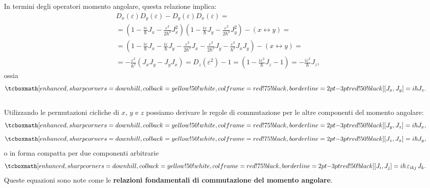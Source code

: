 \documentclass[a4paper,12pt,oneside]{book}
\begin{document}
In termini degli operatori momento angolare, questa relazione implica:
	\begin{align}
		& D_x (\varepsilon)D_y (\varepsilon)-D_y (\varepsilon)D_x (\varepsilon)= \nonumber\\
		&  = \left(1-\frac{i\varepsilon}{\hbar} J_x -\frac{\varepsilon ^2}{2\hbar ^2}J_x ^2\right)\left(1-\frac{i\varepsilon}{\hbar} J_y -\frac{\varepsilon ^2}{2\hbar ^2}J_y ^2\right)- \left( x \leftrightarrow y\right) =\nonumber \\
		& = \left(1-\frac{i\varepsilon}{\hbar} J_x-\frac{i\varepsilon}{\hbar} J_y-\frac{\varepsilon ^2}{2\hbar ^2}J_x-\frac{\varepsilon ^2}{2\hbar ^2}J_y-\frac{\varepsilon ^2}{\hbar ^2}J_xJ_y \right) - \left( x \leftrightarrow y\right) = \nonumber \\
		&  = -\frac{\varepsilon ^2}{\hbar ^2}\left(J_xJ_y-J_y J_x\right) = D_z (\varepsilon ^2)- 1= \left(1-\frac{i\varepsilon ^2}{\hbar} J_z-1\right)=-\frac{i\varepsilon ^2}{\hbar} J_z, 
	\end{align}
ossia
	\begin{equation}
		\tcboxmath[enhanced, sharp corners=downhill, colback=yellow!50!white, colframe=red!75!black, borderline={2pt}{-3pt}{red!50!black}]{
			[ J_x, J_y ] = i\hbar J_z.
			 }
	\end{equation}\\
	
Utilizzando le permutazioni cicliche di $x$, $y$ e $z$ possiamo derivare le regole di commutazione per le altre componenti del momento angolare:
	\begin{equation}
		\tcboxmath[enhanced, sharp corners=downhill, colback=yellow!50!white, colframe=red!75!black, borderline={2pt}{-3pt}{red!50!black}]{
			[ J_y, J_z ] = i\hbar J_x,
			}
	\end{equation}
	\begin{equation}
		\tcboxmath[enhanced, sharp corners=downhill, colback=yellow!50!white, colframe=red!75!black, borderline={2pt}{-3pt}{red!50!black}]{
			[ J_z, J_x ] = i\hbar J_y,
			}
	\end{equation}
o in forma compatta per due componenti arbitrarie
	\begin{equation}
		\tcboxmath[enhanced, sharp corners=downhill, colback=yellow!50!white, colframe=red!75!black, borderline={2pt}{-3pt}{red!50!black}]{
			[ J_i, J_j ] = i\hbar\, \varepsilon _{ikj}\,J_k.
			}
	\label{eq:cap16_1}
	\end{equation}
Queste equazioni sono note come le \textbf{relazioni fondamentali di commutazione del momento angolare}.\\
\end{document}
